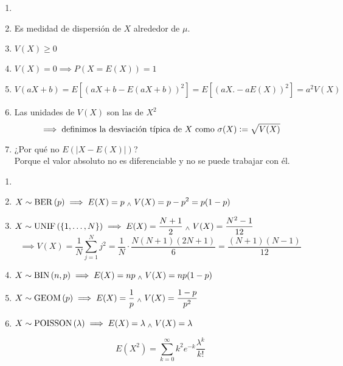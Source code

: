 \begin{obs}
    \begin{enumerate}
        \item[] 
        \item Es medidad de dispersión de $X$ alrededor de $\mu$.
        \item $V(X)\geq 0$
        \item $V(X)=0\implies P(X=E(X))=1$
        \item $V(aX+b)=E[(aX+b-E(aX+b))^2]=E[(aX.-aE(X))^2]=a^2V(X)$
        \item Las unidades de $V(X)$ son las de $X^2$ $$\implies \text{definimos la desviación típica de $X$ como } \sigma(X)\vcentcolon=\sqrt{V(X)}$$
        \item ¿Por qué no $E(|X-E(X)|)$? \\
        Porque el valor absoluto no es diferenciable y no se puede trabajar con él.
    \end{enumerate}
\end{obs}

\begin{ejem}
    \begin{enumerate}
        \item[]
        \item $\displaystyle X\sim\operatorname{BER}\left(p\right) \implies E(X)=p \; _{\wedge} \; V(X)=p-p^2=p(1-p)$
        \item $\displaystyle X\sim \operatorname{UNIF}\left(\{1, \dots, N\}\right) \implies E(X)=\frac{N+1}{2} \; _{\wedge} \; V(X)=\frac{N^2-1}{12}$
        \[\implies V(X)=\frac{1}{N}\sum_{j=1}^N j^2=\frac{1}{N}\cdot\frac{N(N+1)(2N+1)}{6}=\frac{(N+1)(N-1)}{12}\]
        \item $\displaystyle X\sim\operatorname{BIN}\left(n, p\right) \implies E(X)=np \; _{\wedge} \; V(X)=np(1-p)$
        \begin{dem}
            
        \end{dem}
        \item $\displaystyle X\sim\operatorname{GEOM}\left(p\right) \implies E(X)=\frac{1}{p} \; _{\wedge} \; V(X)=\frac{1-p}{p^2}$
        \begin{dem}
            
        \end{dem}
        \item $X\sim\operatorname{POISSON}\left(\lambda\right) \implies E(X)=\lambda \; _{\wedge} \; V(X)=\lambda$
        \begin{dem}
            \[E(X^2)=\sum_{k=0}^{\infty} k^2 e^{-k}\frac{\lambda^k}{k!}\]
        \end{dem}
    \end{enumerate}
\end{ejem}

